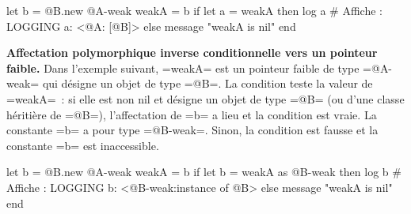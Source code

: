 \begin{galgas3}
  let b = @B.new
  @A-weak weakA = b
  if let a = weakA then
    log a # Affiche : LOGGING a: <@A: [@B]>
  else
    message "weakA is nil\n"
  end
\end{galgas3}


{\bf Affectation polymorphique inverse conditionnelle vers un pointeur faible.} Dans l'exemple suivant, \ggst=weakA= est un pointeur faible de type \ggst=@A-weak= qui désigne un objet de type \ggst=@B=. La condition teste la valeur de \ggst=weakA=~: si elle est non nil et désigne un objet de type \ggst=@B= (ou d'une classe héritière de \ggst=@B=), l'affectation de \ggst=b= a lieu et la condition est vraie. La constante \ggst=b= a pour type \ggst=@B-weak=. Sinon, la condition est fausse et la constante \ggst=b= est inaccessible.

\begin{galgas3}
  let b = @B.new
  @A-weak weakA = b
  if let b = weakA as @B-weak then
    log b # Affiche : LOGGING b: <@B-weak:instance of @B>
  else
    message "weakA is nil\n"
  end
\end{galgas3}


